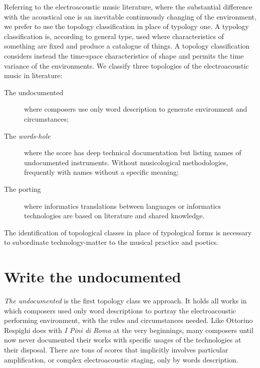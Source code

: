 \documentclass[twoside,a4paper]{article}
\begin{document}
Referring to the electroacoustic music literature, where the substantial difference with the acoustical one is an inevitable continuously changing of the environment, we prefer to use the topology classification in place of typology one. A typology classification is, according to general type, used where characteristics of something are fixed and produce a catalogue of things. A topology classification considers instead the time-space characteristics of shape and permits the time variance of the environments. We classify three topologies of the electroacoustic music in literature:

\begin{description}
  \item[The undocumented] where composers use only word description to generate environment and circumstances;
  \item[The \emph{words-hole}] where the score has deep technical documentation but listing names of undocumented instruments. Without musicological methodologies, frequently with names without a specific meaning;
  \item[The porting] where informatics translations between languages or informatics technologies are based on literature and shared knowledge.
\end{description}

The identification of topological classes in place of typological forms is necessary to subordinate technology-matter to the musical practice and poetics. %


\section{Write the undocumented}
\label{sec:writing}

\emph{The undocumented} is the first topology class we approach. It holds all works in which composers used only word descriptions to portray the electroacoustic performing environment, with the rules and circumstances needed. Like Ottorino Respighi does with \emph{I Pini di Roma} \cite{ropr25} at the very beginnings, many composers until now never documented their works with specific usages of the technologies at their disposal. There are tons of scores that implicitly involves particular amplification, or complex electroacoustic staging, only by words description. 
\end{document}
